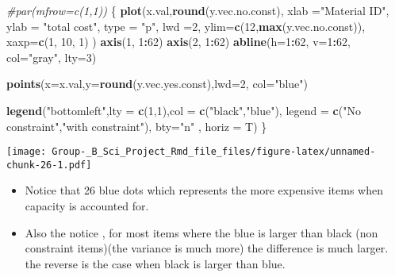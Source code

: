 \documentclass[
]{article}
\newenvironment{Shaded}{\begin{snugshade}}{\end{snugshade}}
\newcommand{\CommentTok}[1]{\textcolor[rgb]{0.56,0.35,0.01}{\textit{#1}}}
\newcommand{\DataTypeTok}[1]{\textcolor[rgb]{0.13,0.29,0.53}{#1}}
\newcommand{\DecValTok}[1]{\textcolor[rgb]{0.00,0.00,0.81}{#1}}
\newcommand{\KeywordTok}[1]{\textcolor[rgb]{0.13,0.29,0.53}{\textbf{#1}}}
\newcommand{\NormalTok}[1]{#1}
\newcommand{\OperatorTok}[1]{\textcolor[rgb]{0.81,0.36,0.00}{\textbf{#1}}}
\newcommand{\StringTok}[1]{\textcolor[rgb]{0.31,0.60,0.02}{#1}}
\begin{document}
\begin{Shaded}
\begin{Highlighting}[]
\CommentTok{#par(mfrow=c(1,1))}
\NormalTok{\{ }
  \KeywordTok{plot}\NormalTok{(x.val,}\KeywordTok{round}\NormalTok{(y.vec.no.const), }\DataTypeTok{xlab =}\StringTok{"Material ID"}\NormalTok{, }\DataTypeTok{ylab =} \StringTok{"total cost"}\NormalTok{, }\DataTypeTok{type =} \StringTok{"p"}\NormalTok{, }\DataTypeTok{lwd =}\DecValTok{2}\NormalTok{, }\DataTypeTok{ylim=}\KeywordTok{c}\NormalTok{(}\DecValTok{12}\NormalTok{,}\KeywordTok{max}\NormalTok{(y.vec.no.const)), }\DataTypeTok{xaxp=}\KeywordTok{c}\NormalTok{(}\DecValTok{1}\NormalTok{, }\DecValTok{10}\NormalTok{, }\DecValTok{1}\NormalTok{) )}
  \KeywordTok{axis}\NormalTok{(}\DecValTok{1}\NormalTok{, }\DecValTok{1}\OperatorTok{:}\DecValTok{62}\NormalTok{)}
\KeywordTok{axis}\NormalTok{(}\DecValTok{2}\NormalTok{, }\DecValTok{1}\OperatorTok{:}\DecValTok{62}\NormalTok{)}
\KeywordTok{abline}\NormalTok{(}\DataTypeTok{h=}\DecValTok{1}\OperatorTok{:}\DecValTok{62}\NormalTok{, }\DataTypeTok{v=}\DecValTok{1}\OperatorTok{:}\DecValTok{62}\NormalTok{, }\DataTypeTok{col=}\StringTok{"gray"}\NormalTok{, }\DataTypeTok{lty=}\DecValTok{3}\NormalTok{)}

\KeywordTok{points}\NormalTok{(}\DataTypeTok{x=}\NormalTok{x.val,}\DataTypeTok{y=}\KeywordTok{round}\NormalTok{(y.vec.yes.const),}\DataTypeTok{lwd=}\DecValTok{2}\NormalTok{, }\DataTypeTok{col=}\StringTok{"blue"}\NormalTok{)}

\KeywordTok{legend}\NormalTok{(}\StringTok{"bottomleft"}\NormalTok{,}\DataTypeTok{lty =} \KeywordTok{c}\NormalTok{(}\DecValTok{1}\NormalTok{,}\DecValTok{1}\NormalTok{),}\DataTypeTok{col =} \KeywordTok{c}\NormalTok{(}\StringTok{"black"}\NormalTok{,}\StringTok{"blue"}\NormalTok{), }\DataTypeTok{legend =} \KeywordTok{c}\NormalTok{(}\StringTok{"No constraint"}\NormalTok{,}\StringTok{"with constraint"}\NormalTok{), }\DataTypeTok{bty=}\StringTok{"n"}\NormalTok{ , }\DataTypeTok{horiz =}\NormalTok{ T)}
\NormalTok{\}}
\end{Highlighting}
\end{Shaded}

\texttt{[image: Group-\_B\_Sci\_Project\_Rmd\_file\_files/figure-latex/unnamed-chunk-26-1.pdf]}

\begin{itemize}
\item
  Notice that 26 blue dots which represents the more expensive items
  when capacity is accounted for.
\item
  Also the notice , for most items where the blue is larger than black
  (non constraint items)(the variance is much more) the difference is
  much larger. the reverse is the case when black is larger than blue.
\end{itemize}
\end{document}
